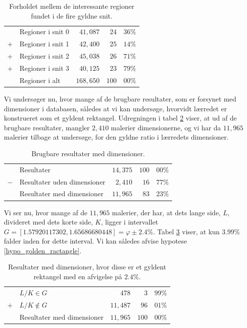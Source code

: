 {\begin{table}[H]
    \centering
    \begin{tabular}{r@{\ \ }p{12em}r|r@{.}l}
            & Regioner i snit 0   &  $41,087$ &  $24$ & $36\%$ \\
        $+$ & Regioner i snit 1   &  $42,400$ &  $25$ & $14\%$ \\
        $+$ & Regioner i snit 2   &  $45,038$ &  $26$ & $71\%$ \\
        $+$ & Regioner i snit 3   &  $40,125$ &  $23$ & $79\%$ \\\hline
            & Regioner i alt      & $168,650$ & $100$ & $00\%$
    \end{tabular}
    \caption[]{Forholdet mellem de interessante regioner fundet i de
    fire gyldne snit.}
    \label{tabel_fire_snit}
\end{table}

Vi undersøger nu, hvor mange af de brugbare resultater, som er forsynet
med dimensioner i databasen, således at vi kan undersøge, hvorvidt
lærredet er konstrueret som et gyldent rektangel. Udregningen i tabel
\ref{tabel_med_dimensioner} viser, at ud af de brugbare resultater,
mangler $2,410$ malerier dimensionerne, og vi har da $11,965$ malerier
tilbage at undersøge, for den gyldne ratio i lærredets dimensioner.

\begin{table}[H]
    \centering
    \begin{tabular}{r@{\ \ }p{14em}r|r@{.}l}
            & Resultater                     & $14,375$ & $100$ & $00\%$ \\
        $-$ & Resultater uden dimensioner    &  $2,410$ &  $16$ & $77\%$ \\\hline
            & Resultater med dimensioner     & $11,965$ &  $83$ & $23\%$
    \end{tabular}
    \caption[]{Brugbare resultater med dimensioner.}
    \label{tabel_med_dimensioner}
\end{table}

Vi ser nu, hvor mange af de $11,965$ malerier, der har, at dets lange
side, $L$, divideret med dets korte side, $K$, ligger i intervallet $G =
[1.57920117302, 1.65686680448] = \varphi \pm 2.4\%$. Tabel
\ref{tabel_real_dimensions} viser, at kun $3.99\%$ falder inden for
dette interval. Vi kan således afvise hypotese
\ref{hypo_golden_ractangle}.

\begin{table}[H]
    \centering
    \begin{tabular}{r@{\ \ }p{14em}r|r@{.}l}
            & $L/K \in G$                  &    $478$ &   $3$ & $99\%$ \\
        $+$ & $L/K \notin G$               & $11,487$ &  $96$ & $01\%$ \\\hline
            & Resultater med dimensioner   & $11,965$ & $100$ & $00\%$
    \end{tabular}
    \caption[]{Resultater med dimensioner, hvor disse er et gyldent
    rektangel med en afvigelse på $2.4\%$.}
    \label{tabel_real_dimensions}
\end{table}

}
